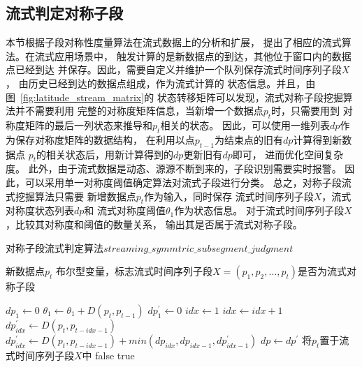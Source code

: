 \subsection{流式判定对称子段}
本节根据子段对称性度量算法在流式数据上的分析和扩展，
提出了相应的流式算法。在流式应用场景中，
触发计算的是新数据点的到达，其他位于窗口内的数据点已经到达
并保存。因此，需要自定义并维护一个队列保存流式时间序列子段$X$，
由历史已经到达的数据点组成，作为流式计算的
状态信息。并且，由图~\ref{fig:latitude_stream_matrix}的
状态转移矩阵可以发现，流式对称子段挖掘算法并不需要利用
完整的对称度矩阵信息，当新增一个数据点$p_t$时，只需要用到
对称度矩阵的最后一列状态来推导和$p_t$相关的状态。
因此，可以使用一维列表$dp$作为保存对称度矩阵的数据结构，
在利用以点$p_{t-1}$为结束点的旧有$dp$计算得到新数据点
$p_t$的相关状态后，用新计算得到的$dp$更新旧有$dp$即可，
进而优化空间复杂度。
此外，由于流式数据是动态、源源不断到来的，子段识别需要实时报警。
因此，可以采用单一对称度阈值确定算法对流式子段进行分类。
总之，对称子段流式挖掘算法只需要
新增数据点$p_t$作为输入，同时保存
流式时间序列子段$X$，流式对称度状态列表$dp$和
流式对称度阈值$\theta_1$作为状态信息。
对于流式时间序列子段$X$，比较其对称度和阈值的数量关系，
输出其是否属于流式对称子段。

\renewcommand{\algorithmicrequire}{\textbf{输入：}\unskip}
\renewcommand{\algorithmicensure}{\textbf{输出：}\unskip}

\begin{algorithm}
  \caption{对称子段流式判定算法$streaming\_symmtric\_subsegment\_judgment$}
  \label{alg:streaming_symmetric_pattern}
  \small
  \begin{algorithmic}
    \REQUIRE 新数据点$p_t$
    \ENSURE 布尔型变量，标志流式时间序列子段$X=\left(p_{1},p_{2},\dots,p_t \right)$是否为流式对称子段

      \STATE $dp_{1} \leftarrow 0$
    \ELSE
      \STATE $\theta_1 \leftarrow \theta_1+D\left(p_{t}, p_{t-1}\right)$
      \STATE $dp_1^{\prime} \leftarrow 0$
      \STATE $ idx \leftarrow 1$
        \STATE $ idx \leftarrow idx+1$
          \STATE $dp_{idx}^{\prime} \leftarrow D\left(p_{t}, p_{t-idx-1}\right)$
        \ELSE
          \STATE $dp_{idx}^{\prime} \leftarrow D\left(p_{t}, p_{t-idx-1}\right)+min(dp_{idx},dp_{idx-1},dp_{idx-1}^{\prime})$
        \ENDIF
      \ENDWHILE
      \STATE $ dp \leftarrow dp^{\prime}$
    \ENDIF
    \STATE 将$p_t$置于流式时间序列子段$X$中
      \RETURN false
    \ELSE
      \RETURN true
    \ENDIF
  \end{algorithmic}
\end{algorithm}

